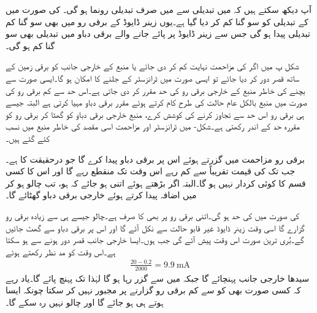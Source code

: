 آپ دیکھ سکتے ہیں کہ  میں  تبدیلی سے  میں صرف  تبدیلی رونما ہو گی۔ کی صورت میں  کے تبدیلی کو سو گنا کم کر دیا گیا ہے۔یوں زینر ڈایوڈ کے برقی رو میں بھی سو گنا کم تبدیلی پیدا ہو گی جس سے زینر ڈایوڈ پر پائے جانے والے برقی دباو میں تبدیلی بھی سو گنا کم ہو گی۔

شکل  پ میں اگر  کی مزاحمت نہایت کم کر دی جائے یا منبع کے خارجی جانب کو برقی زمین کے ساتھ قصر دور کر دیا جائے تو ایسی صورت میں ٹرانزسٹر کے جلنے کا امکان ہو گا۔ایسی صورت سے بچنے کی خاطر منبع کے خارجی برقی رو کی حد مقرر کر دی جاتی ہے۔اس حد سے کم برقی رو کی صورت میں منبع بالکل عام حالت کی طرح کام کرتے ہوئے مقرر برقی دباو مہیا کرتی ہے البتہ جیسے ہی برقی رو اس حد سے تجاوز کرنے کی کوشش کرے، منبع خارجی برقی دباو کو گھٹا کر برقی رو کو مقررہ حد کے اندر رکھتی ہے۔شکل- میں ٹرانزسٹر  اور مزاحمت  اسی مقصد کی خاطر منبع میں نسب کئے گئے ہیں۔

برقی رو مزاحمت  میں گزرتے ہوئے اس  پر  برقی دباو پیدا کرے گا جو درحقیقت  کا  ہے۔جب تک  کی قیمت تقریباً  سے کم رہے اس وقت تک  منقطع رہے گا اور اس کا کسی قسم کا کوئی کردار نہیں ہو گا۔البتہ اگر  بڑھتے ہوئے اتنی ہو جائے کہ  ہو، تب  چالو ہو کر  میں اضافہ پیدا کرتے ہوئے خارجی برقی دباو  گھٹائے گا۔

 کی صورت میں  کی حد  ہو گی۔اتنی برقی رو پر بھی  کا  صرف  ہے۔چالو  جیسے ہی  سے زیادہ برقی رو گزارے گا اسی وقت زینر ڈایوڈ غیر قابو حالت سے نکل آئے گا اور اس پر برقی دباو  سے گھٹ جائیں گے۔بُری ترین صورت اس وقت پیش آئے گی جب  ہوں۔ایسا خارجی جانب قصر دور ہونے سے ہو سکتا ہے۔اس وقت  کو مد نظر رکھتے ہوئے 
\begin{align*}
\frac{20-0.2}{2000}=\SI{9.9}{\milli \ampere}
\end{align*}
سیدھا خارجی جانب پہنچائے گا جبکہ   میں سے  گزر رہا ہو گا لہٰذا  تک پہنچ پائے گا۔یاد رہے کہ  کسی صورت بھی  کو  سے کم برقی رو گزارنے پر مجبور نہیں کر سکتا چونکہ ایسا ہوتے ہی   ہو جائے گا اور  چالو نہیں رہ سکے گا۔

